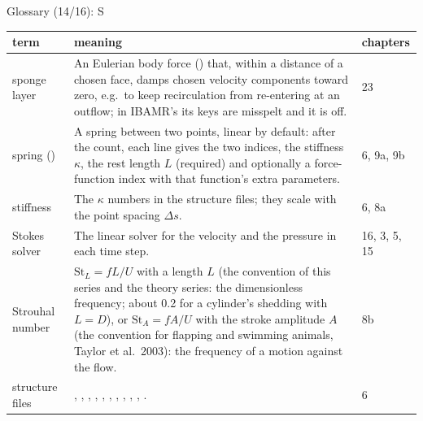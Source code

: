 \documentclass[aspectratio=169,11pt]{beamer}
\makeatletter
\newenvironment{glossarytable}{\scriptsize\renewcommand{\arraystretch}{1.08}%
  \begin{tabular}{@{}L{0.19\textwidth}L{0.63\textwidth}L{0.12\textwidth}@{}}\toprule
  term & meaning & chapters\\\midrule}{\bottomrule\end{tabular}}
\makeatother
\begin{document}
\begin{frame}{Glossary (14/16): S}
\label{fr:g14}
\begin{glossarytable}
sponge layer & An Eulerian body force () that, within a distance  of a chosen face, damps chosen velocity components toward zero, e.g.\ to keep recirculation from re-entering at an outflow; in IBAMR's  its keys are misspelt and it is off. & 23\\
spring () & A spring between two points, linear by default: after the count, each line gives the two indices, the stiffness $\kappa$, the rest length $L$ (required) and optionally a force-function index with that function's extra parameters. & 6, 9a, 9b\\
stiffness & The $\kappa$ numbers in the structure files; they scale with the point spacing $\Delta s$. & 6, 8a\\
Stokes solver & The linear solver for the velocity and the pressure in each time step. & 16, 3, 5, 15\\
Strouhal number & $\mathrm{St}_L = fL/U$ with a length $L$ (the convention of this series and the theory series: the dimensionless frequency; about 0.2 for a cylinder's shedding with $L = D$), or $\mathrm{St}_A = fA/U$ with the stroke amplitude $A$ (the convention for flapping and swimming animals, Taylor et al.\ 2003): the frequency of a motion against the flow. & 8b\\
structure files & , , , , , , , , , , . & 6\\
\end{glossarytable}
\end{frame}
\end{document}
